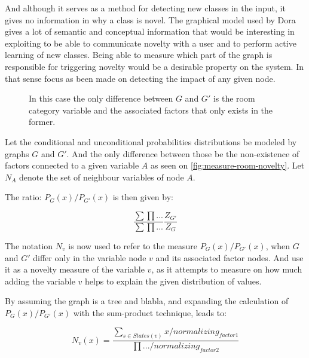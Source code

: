 \documentclass[runningheads,a4paper]{llncs}
\begin{document}
And although it serves as a method for detecting new classes in the input, it gives no information
in why a class is novel.
The graphical model used by Dora gives a lot of semantic and conceptual information that would be
interesting in exploiting to be able to communicate novelty with a user and to perform
active learning of new classes.
Being able to measure which part of the graph is responsible for triggering novelty would be
a desirable property on the system.
In that sense focus as been made on detecting the impact of any given node.

\begin{figure}[h]
\qquad
{}

\caption{\label{fig:measure-room-novelty}In this case the only difference between $G$ and $G'$ is the room category variable
         and the associated factors that only exists in the former.}
\end{figure}

Let the conditional and unconditional probabilities distributions be modeled by graphs
$G$ and $G'$.
And the only difference between those be the non-existence of factors connected to a given
variable $A$ as seen on \autoref{fig:measure-room-novelty}.
Let $N_A$ denote the set of neighbour variables of node $A$.

The ratio: $P_G(x)/P_{G'}(x)$ is then given by:

\begin{equation}
\frac{\sum \prod ... }{\sum \prod ...}  \frac{Z_{G'}}{Z_G}
\end{equation}


The notation $N_v$ is now used to refer to the measure $P_G(x)/P_{G'}(x)$, when $G$ and $G'$ differ only in the variable node $v$ and
its associated factor nodes.
And use it as a novelty measure of the variable $v$, as it attempts to measure on how much adding the variable $v$ helps to explain the
given distribution of values.

By assuming the graph is a tree and blabla, and expanding the calculation of $P_G(x)/P_{G'}(x)$ with the sum-product technique, leads to:

\begin{equation}
N_v(x) = \frac{\sum_{s \in States(v)}x / normalizing_{factor1}}{\prod{...} / normalizing_{factor2}}
\end{equation}
\end{document}
